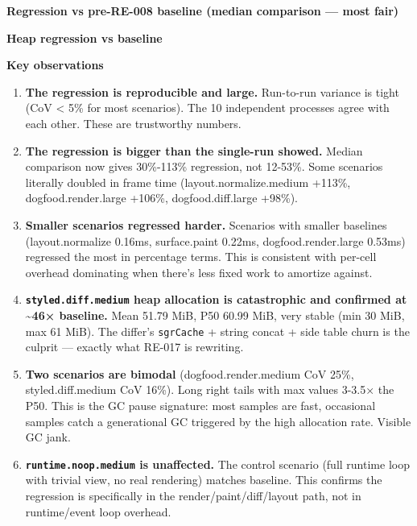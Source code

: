 

\textbf{Regression vs pre-RE-008 baseline (median comparison --- most fair)}



\textbf{Heap regression vs baseline}



\textbf{Key observations}

\begin{enumerate}
\def\labelenumi{\arabic{enumi}.}
\item
  \textbf{The regression is reproducible and large.} Run-to-run variance is tight (CoV \textless{} 5\% for most scenarios). The 10 independent processes agree with each other. These are trustworthy numbers.
\item
  \textbf{The regression is bigger than the single-run showed.} Median comparison now gives 30\%-113\% regression, not 12-53\%. Some scenarios literally doubled in frame time (layout.normalize.medium +113\%, dogfood.render.large +106\%, dogfood.diff.large +98\%).
\item
  \textbf{Smaller scenarios regressed harder.} Scenarios with smaller baselines (layout.normalize 0.16ms, surface.paint 0.22ms, dogfood.render.large 0.53ms) regressed the most in percentage terms. This is consistent with per-cell overhead dominating when there's less fixed work to amortize against.
\item
  \textbf{\texttt{s\allowbreak{}t\allowbreak{}y\allowbreak{}l\allowbreak{}e\allowbreak{}d\allowbreak{}.\allowbreak{}d\allowbreak{}i\allowbreak{}f\allowbreak{}f\allowbreak{}.\allowbreak{}m\allowbreak{}e\allowbreak{}d\allowbreak{}i\allowbreak{}u\allowbreak{}m} heap allocation is catastrophic and confirmed at \textasciitilde46× baseline.} Mean 51.79 MiB, P50 60.99 MiB, very stable (min 30 MiB, max 61 MiB). The differ's \texttt{s\allowbreak{}g\allowbreak{}r\allowbreak{}C\allowbreak{}a\allowbreak{}c\allowbreak{}h\allowbreak{}e} + string concat + side table churn is the culprit --- exactly what RE-017 is rewriting.
\item
  \textbf{Two scenarios are bimodal} (dogfood.render.medium CoV 25\%, styled.diff.medium CoV 16\%). Long right tails with max values 3-3.5× the P50. This is the GC pause signature: most samples are fast, occasional samples catch a generational GC triggered by the high allocation rate. Visible GC jank.
\item
  \textbf{\texttt{r\allowbreak{}u\allowbreak{}n\allowbreak{}t\allowbreak{}i\allowbreak{}m\allowbreak{}e\allowbreak{}.\allowbreak{}n\allowbreak{}o\allowbreak{}o\allowbreak{}p\allowbreak{}.\allowbreak{}m\allowbreak{}e\allowbreak{}d\allowbreak{}i\allowbreak{}u\allowbreak{}m} is unaffected.} The control scenario (full runtime loop with trivial view, no real rendering) matches baseline. This confirms the regression is specifically in the render/paint/diff/layout path, not in runtime/event loop overhead.

\end{enumerate}
